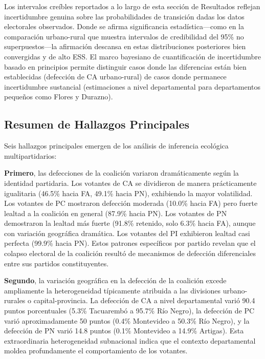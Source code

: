 Los intervalos creíbles reportados a lo largo de esta sección de Resultados reflejan incertidumbre genuina sobre las probabilidades de transición dadas los datos electorales observados. Donde se afirma significancia estadística---como en la comparación urbano-rural que muestra intervalos de credibilidad del 95\% no superpuestos---la afirmación descansa en estas distribuciones posteriores bien convergidas y de alto ESS. El marco bayesiano de cuantificación de incertidumbre basado en principios permite distinguir casos donde las diferencias están bien establecidas (defección de CA urbano-rural) de casos donde permanece incertidumbre sustancial (estimaciones a nivel departamental para departamentos pequeños como Flores y Durazno).

\subsection{Resumen de Hallazgos Principales}
\label{sec:resultados_resumen}

Seis hallazgos principales emergen de los análisis de inferencia ecológica multipartidarios:

\textbf{Primero}, las defecciones de la coalición variaron dramáticamente según la identidad partidaria. Los votantes de CA se dividieron de manera prácticamente igualitaria (46.5\% hacia FA, 49.1\% hacia PN), exhibiendo la mayor volatilidad. Los votantes de PC mostraron defección moderada (10.0\% hacia FA) pero fuerte lealtad a la coalición en general (87.9\% hacia PN). Los votantes de PN demostraron la lealtad más fuerte (91.8\% retenido, solo 6.3\% hacia FA), aunque con variación geográfica dramática. Los votantes del PI exhibieron lealtad casi perfecta (99.9\% hacia PN). Estos patrones específicos por partido revelan que el colapso electoral de la coalición resultó de mecanismos de defección diferenciales entre sus partidos constituyentes.

\textbf{Segundo}, la variación geográfica en la defección de la coalición excede ampliamente la heterogeneidad típicamente atribuida a las divisiones urbano-rurales o capital-provincia. La defección de CA a nivel departamental varió 90.4 puntos porcentuales (5.3\% Tacuarembó a 95.7\% Río Negro), la defección de PC varió aproximadamente 50 puntos (0.4\% Montevideo a 50.3\% Río Negro), y la defección de PN varió 14.8 puntos (0.1\% Montevideo a 14.9\% Artigas). Esta extraordinaria heterogeneidad subnacional indica que el contexto departamental moldea profundamente el comportamiento de los votantes.

